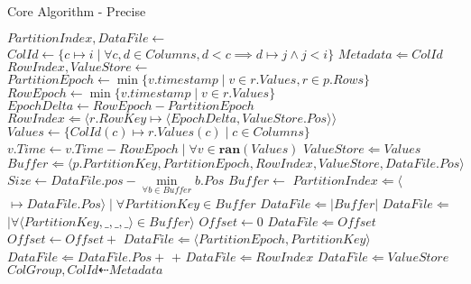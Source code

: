 \documentclass[fleqn]{article}
\begin{document}
\begin{algorithm}
\scriptsize
\caption{Core Algorithm - Precise}
\begin{algorithmic}[1]
\State $PartitionIndex, DataFile \gets $ 
\State $ColId \gets \{c \mapsto i \mid \forall c, d \in Columns, d < c \implies d \mapsto j \wedge j < i \}$
\State $Metadata \Leftarrow ColId$
\Statex
{} 
 \State $RowIndex, ValueStore \gets $ 
 \State $PartitionEpoch \gets \min \{v.timestamp \mid v \in r.Values, r \in p.Rows\}$
 \Statex
   \State $RowEpoch \gets \min \{v.timestamp \mid v \in r.Values\}$
   \State $EpochDelta \gets RowEpoch - PartitionEpoch$
   \State $RowIndex \Leftarrow \langle r.RowKey \mapsto \langle EpochDelta, ValueStore.Pos \rangle \rangle $ 
   \State $Values \gets \{ ColId(c) \mapsto r.Values(c) \mid c \in Columns \}$
   \State $v.Time \gets v.Time - RowEpoch \mid \forall v \in \mathbf{ran}(Values)$
   \State $ ValueStore \Leftarrow Values $
 \EndFor
\Statex
 \State $Buffer \Leftarrow \langle p.PartitionKey, PartitionEpoch, RowIndex, ValueStore, DataFile.Pos \rangle$
 \State $Size \gets DataFile.pos - \min\limits_{\forall b \in Buffer} b.Pos $
   \State {}
   \State $Buffer \gets $ 
 \EndIf
\EndFor
\State {}
\EndProcedure
\Statex
{}
   \State $PartitionIndex \Leftarrow \langle $$ \mapsto DataFile.Pos \rangle \mid \forall PartitionKey \in Buffer$
   \State $DataFile \Leftarrow \lvert Buffer \rvert$
   \State $DataFile \Leftarrow $  $ \mid \forall \langle PartitionKey, \_,\_,\_\rangle \in Buffer \rangle$
   \State $Offset \gets 0$
     \State $DataFile \Leftarrow Offset$
     \State $Offset \gets Offset + $ 
   \EndFor
    \State $DataFile \Leftarrow \langle PartitionEpoch, PartitionKey \rangle$
    \State $DataFile \Leftarrow DataFile.Pos + $  $ + $ 
    \State $DataFile \Leftarrow RowIndex$
    \State $DataFile \Leftarrow ValueStore$
   \EndFor
\EndProcedure
\Statex
{}
\State $ColGroup, ColId \dashleftarrow Metadata$

\end{algorithmic}
\end{algorithm}
\end{document}
